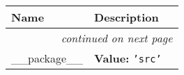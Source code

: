     \vspace{-1cm}
\hspace{\varindent}\begin{longtable}{|p{\varnamewidth}|p{\vardescrwidth}|l}
\cline{1-2}
\cline{1-2} \centering \textbf{Name} & \centering \textbf{Description}& \\
\cline{1-2}
\endhead\cline{1-2}\multicolumn{3}{r}{\small\textit{continued on next page}}\\\endfoot\cline{1-2}
\endlastfoot\raggedright \_\-\_\-p\-a\-c\-k\-a\-g\-e\-\_\-\_\- & \raggedright \textbf{Value:} 
{\tt \texttt{'}\texttt{src}\texttt{'}}&\\
\cline{1-2}
\end{longtable}

